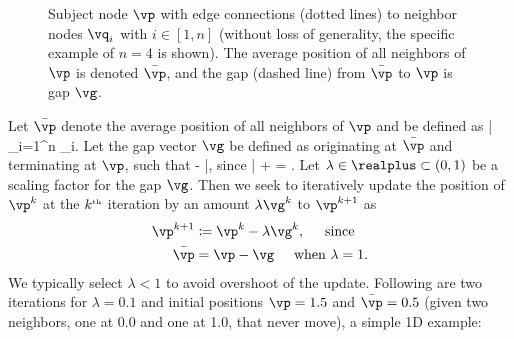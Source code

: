 \documentclass[11pt, oneside]{article}   	%
\begin{document}
\begin{figure}[htb]
  \begin{center}


  \end{center}

  \caption{Subject node $\vp$ with edge connections (dotted lines) 
  to neighbor nodes $\vq_i$ 
  with $i \in [1, n]$ (without loss of generality, 
  the specific example of $n = 4$ is shown).  
  The average position of all neighbors of $\vp$ 
  is denoted $\bar{\vp}$, and the gap (dashed line) 
  from $\bar{\vp}$ to $\vp$ is gap $\vg$.}
\label{fig:node_p} %
\end{figure}
Let $\bar{\vp}$ denote the average position of all neighbors of $\vp$ and be 
defined as
\be
  \bar{\vp} \coloneqq {} \sum_{i=1}^n \vq_i.
\ee
Let the gap vector $\vg$ be defined as originating at $\bar{\vp}$ and terminating
at $\vp$, such that
\be
 \vg \coloneqq \vp - \bar{\vp}, \;\;\; \mbox{since} \;\;\; \bar{\vp} + \vg = \vp.
\ee
Let $\lambda \in \realplus \subset (0, 1)$ be a scaling factor for the 
gap $\vg$.  Then we seek to iteratively update the position of $\vp^k$ at the
$k^{\mbox{\tiny th}}$ iteration by an amount $\lambda \vg^k$ to $\vp^{k+1}$ as
\begin{align}
  \vp^{k+1} & \coloneqq \vp^k - \lambda \vg^k, \hspace{0.5cm} \mbox{since} \\
  \bar{\vp} & = \vp - \vg \hspace{0.5cm} \mbox{when } \lambda = 1.
\end{align}
We typically select $\lambda < 1$ to avoid overshoot of the update.  Following
are two iterations for $\lambda = 0.1$ and initial positions $\vp = 1.5$ and
$\bar{\vp} = 0.5$ (given two neighbors, one at 0.0 and one at 1.0, that 
never move), a simple 1D example:
\end{document}
